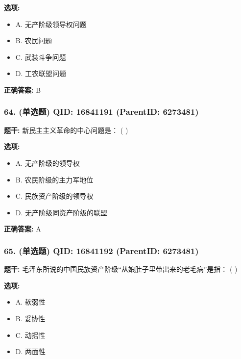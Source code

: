 \documentclass[12pt,UTF8]{ctexart}
\begin{document}
\textbf{选项:}
\begin{itemize}[leftmargin=*]

  \item A. 无产阶级领导权问题

  \item B. 农民问题

  \item C. 武装斗争问题

  \item D. 工农联盟问题

\end{itemize}

\textbf{正确答案:}
B

\vspace{0.3em}\hrulefill\vspace{0.7em}

\subsubsection*{64. (单选题) \small QID: 16841191 (ParentID: 6273481)}

\textbf{题干:}
新民主主义革命的中心问题是： ( )



\textbf{选项:}
\begin{itemize}[leftmargin=*]

  \item A. 无产阶级的领导权

  \item B. 农民阶级的主力军地位

  \item C. 民族资产阶级的领导权

  \item D. 无产阶级同资产阶级的联盟

\end{itemize}

\textbf{正确答案:}
A

\vspace{0.3em}\hrulefill\vspace{0.7em}

\subsubsection*{65. (单选题) \small QID: 16841192 (ParentID: 6273481)}

\textbf{题干:}
毛泽东所说的中国民族资产阶级“从娘肚子里带出来的老毛病”是指： ( )



\textbf{选项:}
\begin{itemize}[leftmargin=*]

  \item A. 软弱性

  \item B. 妥协性

  \item C. 动摇性

  \item D. 两面性

\end{itemize}
\end{document}
